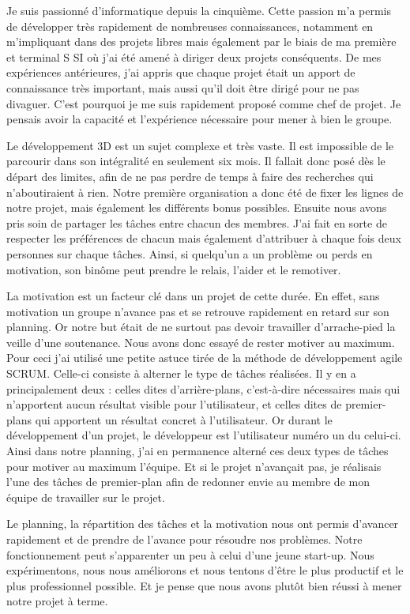 \documentclass[11pt]{report}
\begin{document}
Je suis passionné d’informatique depuis la cinquième. Cette passion m’a permis de développer très rapidement de nombreuses connaissances, notamment en m’impliquant dans des projets libres mais également par le biais de ma première et terminal S SI où j’ai été amené à diriger deux projets conséquents. De mes expériences antérieures, j’ai appris que chaque projet était un apport de connaissance très important, mais aussi qu’il doit être dirigé pour ne pas divaguer. C’est pourquoi je me suis rapidement proposé comme chef de projet. Je pensais avoir la capacité et l’expérience nécessaire pour mener à bien le groupe.

Le développement 3D est un sujet complexe et très vaste. Il est impossible de le parcourir dans son intégralité en seulement six mois. Il fallait donc posé dès le départ des limites, afin de ne pas perdre de temps à faire des recherches qui n’aboutiraient à rien. Notre première organisation a donc été de fixer les lignes de notre projet, mais également les différents bonus possibles. Ensuite nous avons pris soin de partager les tâches entre chacun des membres. J’ai fait en sorte de respecter les préférences de chacun mais également d’attribuer à chaque fois deux personnes sur chaque tâches. Ainsi, si quelqu’un a un problème ou perds en motivation, son binôme peut prendre le relais, l’aider et le remotiver.

La motivation est un facteur clé dans un projet de cette durée. En effet, sans motivation un groupe n’avance pas et se retrouve rapidement en retard sur son planning. Or notre but était de ne surtout pas devoir travailler d’arrache-pied la veille d’une soutenance. Nous avons donc essayé de rester motiver au maximum. Pour ceci j’ai utilisé une petite astuce tirée de la méthode de développement agile SCRUM. Celle-ci consiste à alterner le type de tâches réalisées. Il y en a principalement deux : celles dites d’arrière-plans, c’est-à-dire nécessaires mais qui n’apportent aucun résultat visible pour l’utilisateur, et celles dites de premier-plans qui apportent un résultat concret à l’utilisateur. Or durant le développement d’un projet, le développeur est l’utilisateur numéro un du celui-ci. Ainsi dans notre planning, j’ai en permanence alterné ces deux types de tâches pour motiver au maximum l’équipe. Et si le projet n’avançait pas, je réalisais l’une des tâches de premier-plan afin de redonner envie au membre de mon équipe de travailler sur le projet.

Le planning, la répartition des tâches et la motivation nous ont permis d’avancer rapidement et de prendre de l’avance pour résoudre nos problèmes. Notre fonctionnement peut s’apparenter un peu à celui d’une jeune start-up. Nous expérimentons, nous nous améliorons et nous tentons d’être le plus productif et le plus professionnel possible. Et je pense que nous avons plutôt bien réussi à mener notre projet à terme.
\end{document}
